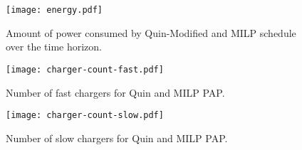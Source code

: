 \begin{figure}[htpb]
\centering
    \texttt{[image: energy.pdf]}
    \caption{Amount of power consumed by Quin-Modified and MILP schedule over the time horizon.}
    \label{fig:energy-usage}
\end{figure}

\begin{subfigures}
    \begin{figure}[htpb]
    \centering
        \texttt{[image: charger-count-fast.pdf]}
        \caption{Number of fast chargers for Quin and MILP PAP.}
        \label{subfig:fast-charger-usage}
    \end{figure}

    \hfill

    \begin{figure}[htpb]
    \centering
        \texttt{[image: charger-count-slow.pdf]}
        \caption{Number of slow chargers for Quin and MILP PAP.}
        \label{subfig:slow-charger-usage}
    \end{figure}
\end{subfigures}
